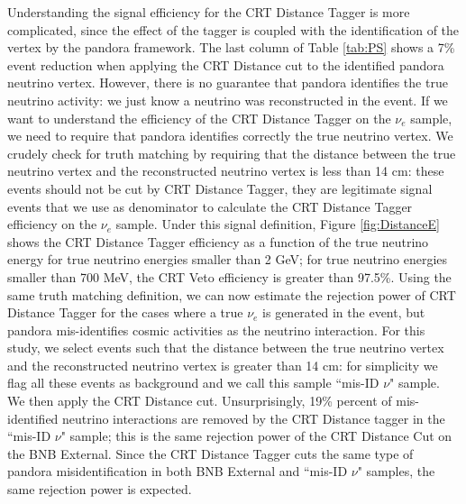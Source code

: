Understanding the signal efficiency for the CRT Distance Tagger is more complicated, since the effect of the tagger is coupled with the identification of the vertex by the pandora framework. The last column of  Table \ref{tab:PS} shows a 7\% event reduction when applying the CRT Distance cut to the identified pandora neutrino vertex. However, there is no guarantee that pandora identifies the true neutrino activity: we just know a neutrino was reconstructed in the event.
If we want to understand the efficiency of the CRT Distance Tagger on the $\nu_e$ sample, we need to require that pandora identifies correctly the true neutrino vertex. We crudely check for truth matching by requiring that the distance between the true neutrino vertex and the reconstructed neutrino vertex is less than 14 cm: these events should not be cut by CRT Distance Tagger, they are legitimate signal events that we use as denominator to calculate the CRT Distance Tagger efficiency on the $\nu_e$ sample.  Under this signal definition, Figure \ref{fig:DistanceE} shows the CRT Distance Tagger efficiency as a function of the true neutrino energy for true neutrino energies smaller than 2 GeV;  for true neutrino energies smaller than 700 MeV, the CRT Veto efficiency is greater than 97.5\%. Using the same truth matching definition, we can now estimate the rejection power of CRT Distance Tagger for the cases where a true $\nu_e$ is generated in the event, but pandora mis-identifies cosmic activities as the neutrino interaction. For this study, we select events such that the distance between the true neutrino vertex and the reconstructed neutrino vertex is greater than 14 cm: for simplicity we flag all these events as background and we call this sample ``mis-ID $\nu$" sample. We then apply the CRT Distance cut. Unsurprisingly, 19\% percent of mis-identified neutrino interactions are removed by the CRT Distance tagger in the ``mis-ID $\nu$" sample; this is the same rejection power of the CRT Distance Cut on the BNB External. Since the CRT Distance Tagger cuts the same type of pandora misidentification in both BNB External and ``mis-ID $\nu$" samples, the same rejection power is expected.



